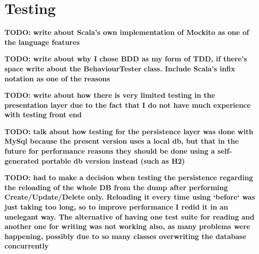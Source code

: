 \section{Testing} \label{sec:Testing}

\textbf{TODO: write about Scala's own implementation of Mockito as one of the
language features}


\textbf{TODO: write about why I chose BDD as my form of TDD, if there's space
write about the BehaviourTester class. Include Scala's infix notation as one of
the reasons}

\textbf{TODO: write about how there is very limited testing in the presentation
layer due to the fact that I do not have much experience with testing front
end}

\textbf{TODO: talk about how testing for the persistence layer was done with
MySql because the present version uses a local db, but that in the future for
performance reasons they should be done using a self-generated portable db
version instead (such as H2)}

\textbf{TODO: had to make a decision when testing the persistence regarding the
reloading of the whole DB from the dump after performing Create/Update/Delete only.
Reloading it every time using `before` was just taking too long, so to improve
performance I redid it in an unelegant way. The alternative of having one test suite for 
reading and another one for writing was not working also, as many problems were happening,
possibly due to so many classes overwriting the database concurrently}
